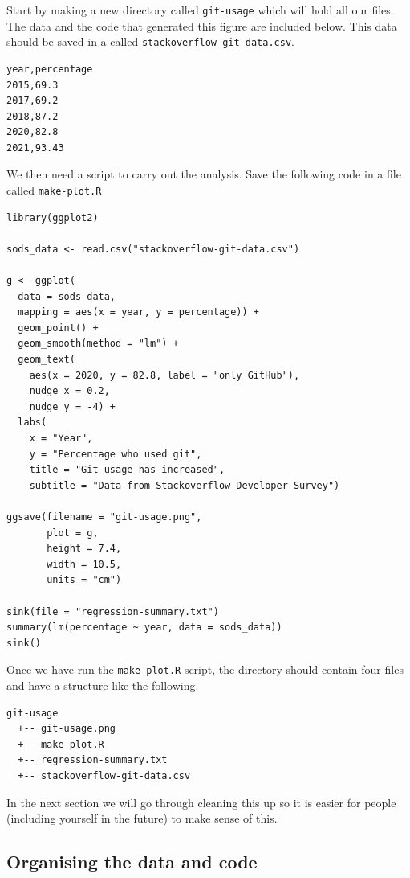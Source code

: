\documentclass[11pt,onecolumn]{scrartcl}
\begin{document}
Start by making a new directory called \texttt{git-usage} which will hold all our
files. The data and the code that generated this figure are included below. This
data should be saved in a called \texttt{stackoverflow-git-data.csv}.

\begin{Verbatim}[frame=single,framerule=0.5mm,framesep=2mm,label=Git Usage,xleftmargin=5cm,xrightmargin=5cm]
year,percentage
2015,69.3
2017,69.2
2018,87.2
2020,82.8
2021,93.43
\end{Verbatim}

We then need a script to carry out the analysis. Save the following code in a
file called \texttt{make-plot.R}

\lstset{language=r,label= ,caption= ,captionpos=b,numbers=none}
\begin{lstlisting}
library(ggplot2)

sods_data <- read.csv("stackoverflow-git-data.csv")

g <- ggplot(
  data = sods_data,
  mapping = aes(x = year, y = percentage)) +
  geom_point() +
  geom_smooth(method = "lm") +
  geom_text(
    aes(x = 2020, y = 82.8, label = "only GitHub"),
    nudge_x = 0.2,
    nudge_y = -4) +
  labs(
    x = "Year",
    y = "Percentage who used git",
    title = "Git usage has increased",
    subtitle = "Data from Stackoverflow Developer Survey")

ggsave(filename = "git-usage.png",
       plot = g,
       height = 7.4,
       width = 10.5,
       units = "cm")

sink(file = "regression-summary.txt")
summary(lm(percentage ~ year, data = sods_data))
sink()
\end{lstlisting}

Once we have run the \texttt{make-plot.R} script, the directory should contain four files
and have a structure like the following.

\begin{Verbatim}[frame=single,framerule=0.5mm,framesep=2mm,label=Directory contents,xleftmargin=3cm,xrightmargin=3cm]
  git-usage
  +-- git-usage.png
  +-- make-plot.R
  +-- regression-summary.txt
  +-- stackoverflow-git-data.csv
\end{Verbatim}

In the next section we will go through cleaning this up so it is easier for
people (including yourself in the future) to make sense of this.

\subsection{Organising the data and code}
\label{sec:org60f3cc8}
\end{document}
